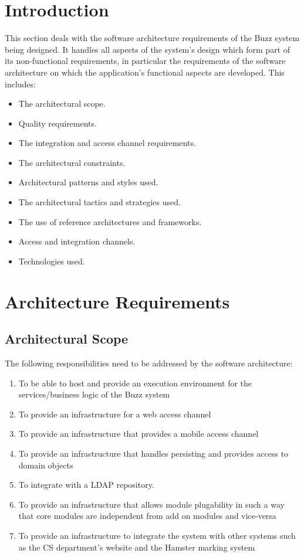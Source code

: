 \documentclass[12pt, oneside]{article}
\begin{document}
\section{Introduction} This section deals with the software architecture requirements of the Buzz system being designed. It handles all aspects of the system's design which form part of its non-functional requirements, in particular the requirements of the software architecture on which the application's functional aspects are developed. This includes:
	\begin{itemize} 
		\item The architectural scope.
		\item Quality requirements.
		\item The integration and access channel requirements.
		\item The architectural constraints.
		\item Architectural patterns and styles used.
		\item The architectural tactics and strategies used.
		\item The use of reference architectures and frameworks.
		\item Access and integration channels.
		\item Technologies used.
	\end{itemize}
\newpage
\section{Architecture Requirements}
	\subsection{Architectural Scope}
	The following responsibilities need to be addressed by the software architecture:
	\begin{enumerate}
		\item To be able to host and provide an execution environment for the services/business logic of the Buzz system
		\item To provide an infrastructure for a web access channel
		\item To provide an infrastructure that provides a mobile access channel
		\item To provide an infrastructure that handles persisting and provides access to domain objects
		\item To integrate with a LDAP repository.
		\item To provide an infrastructure that allows module plugability in such a way that core modules are independent from add on modules and vice-versa
		\item To provide an infrastructure to integrate the system with other systems such as the CS department's website and the Hamster marking system
	\end{enumerate}
\end{document}
